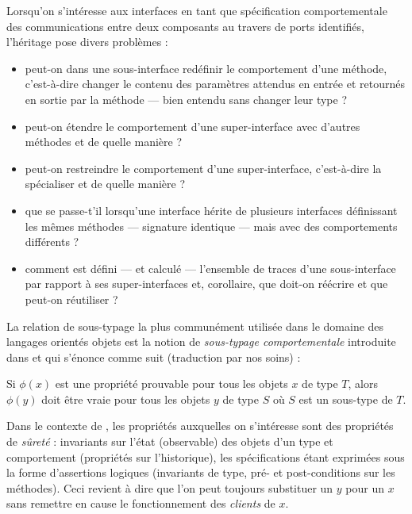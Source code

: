 Lorsqu'on s'int\'eresse aux interfaces en tant que sp\'ecification
comportementale des communications entre deux composants au travers de
ports identifi\'es, l'h\'eritage pose divers probl\`emes :
\begin{itemize}
  \item peut-on dans une sous-interface red\'efinir le comportement
    d'une m\'ethode, c'est-\`a-dire changer le contenu des param\`etres attendus en entr\'ee et
    retourn\'es en sortie par la m\'ethode --- bien entendu sans changer
    leur type ?
  \item peut-on \'etendre le comportement d'une super-interface avec
    d'autres m\'ethodes et de quelle mani\`ere ?
  \item peut-on restreindre le comportement d'une super-interface,
    c'est-\`a-dire la sp\'ecialiser et de quelle mani\`ere ?
  \item que se passe-t'il lorsqu'une interface h\'erite de plusieurs
    interfaces d\'efinissant les m\^emes m\'ethodes --- signature identique
    --- mais avec des comportements diff\'erents ?
  \item comment est d\'efini --- et calcul\'e --- l'ensemble de traces
    d'une sous-interface par rapport \`a ses super-interfaces et, corollaire, que
    doit-on r\'e\'ecrire et que peut-on r\'eutiliser ?
\end{itemize}

La relation de sous-typage la plus commun\'ement utilis\'ee
dans le domaine des langages orient\'es objets 
est la notion de \emph{sous-typage comportementale} introduite dans
\cite{liskov94behavioral} et qui s'\'enonce comme suit (traduction
par nos soins) :
\begin{definition}
Si $\phi(x)$ est une propri\'et\'e prouvable pour tous les  objets $x$ de
type $T$, alors $\phi(y)$ doit \^etre vraie pour tous les objets  $y$ de type
$S$ o\`u  $S$ est un sous-type de $T$.
\end{definition}
Dans le contexte de \cite{liskov94behavioral}, les propri\'et\'es
auxquelles on s'int\'eresse sont des propri\'et\'es de
\emph{s\^uret\'e} : invariants sur l'\'etat (observable) des objets
d'un type et comportement (propri\'et\'es sur l'historique), les
sp\'ecifications \'etant exprim\'ees sous la forme d'assertions
logiques (invariants de type, pr\'e- et post-conditions sur les m\'ethodes).
Ceci revient \`a dire que l'on peut toujours substituer un $y$ pour un
$x$ sans remettre en cause le fonctionnement des \emph{clients} de $x$. 

